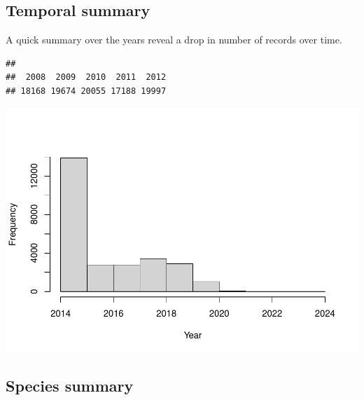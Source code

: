 \documentclass[
  10pt,
]{article}
\newenvironment{Shaded}{\begin{snugshade}}{\end{snugshade}}
\newcommand{\AttributeTok}[1]{\textcolor[rgb]{0.77,0.63,0.00}{#1}}
\newcommand{\FunctionTok}[1]{\textcolor[rgb]{0.00,0.00,0.00}{#1}}
\newcommand{\NormalTok}[1]{#1}
\newcommand{\SpecialCharTok}[1]{\textcolor[rgb]{0.00,0.00,0.00}{#1}}
\newcommand{\StringTok}[1]{\textcolor[rgb]{0.31,0.60,0.02}{#1}}
\begin{document}
\hypertarget{temporal-summary}{%
\subsection{Temporal summary}\label{temporal-summary}}

A quick summary over the years reveal a drop in number of records over time.

\begin{Shaded}
\end{Shaded}

\begin{verbatim}
## 
##  2008  2009  2010  2011  2012 
## 18168 19674 20055 17188 19997
\end{verbatim}

\begin{Shaded}
\end{Shaded}

\includegraphics{r-tools-tutorial_files/figure-latex/timeHist-1.pdf}

\hypertarget{species-summary}{%
\subsection{Species summary}\label{species-summary}}
\end{document}
